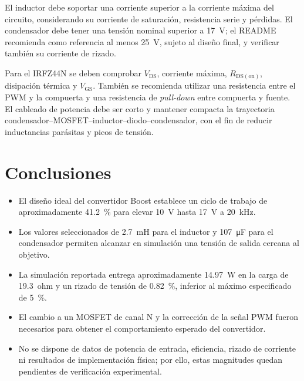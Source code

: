 \documentclass[12pt]{article}
\begin{document}
El inductor debe soportar una corriente superior a la corriente máxima del circuito, considerando su corriente de saturación, resistencia serie y pérdidas. El condensador debe tener una tensión nominal superior a \SI{17}{V}; el README recomienda como referencia al menos \SI{25}{V}, sujeto al diseño final, y verificar también su corriente de rizado.

Para el IRFZ44N se deben comprobar $V_{\mathrm{DS}}$, corriente máxima, $R_{\mathrm{DS(on)}}$, disipación térmica y $V_{\mathrm{GS}}$. También se recomienda utilizar una resistencia entre el PWM y la compuerta y una resistencia de \emph{pull-down} entre compuerta y fuente. El cableado de potencia debe ser corto y mantener compacta la trayectoria condensador--MOSFET--inductor--diodo--condensador, con el fin de reducir inductancias parásitas y picos de tensión.

\section{Conclusiones}
\begin{itemize}
\item El diseño ideal del convertidor Boost establece un ciclo de trabajo de aproximadamente \SI{41.2}{\percent} para elevar \SI{10}{V} hasta \SI{17}{V} a \SI{20}{kHz}.
\item Los valores seleccionados de \SI{2.7}{mH} para el inductor y \SI{107}{\micro F} para el condensador permiten alcanzar en simulación una tensión de salida cercana al objetivo.
\item La simulación reportada entrega aproximadamente \SI{14.97}{W} en la carga de \SI{19.3}{ohm} y un rizado de tensión de \SI{0.82}{\percent}, inferior al máximo especificado de \SI{5}{\percent}.
\item El cambio a un MOSFET de canal N y la corrección de la señal PWM fueron necesarios para obtener el comportamiento esperado del convertidor.
\item No se dispone de datos de potencia de entrada, eficiencia, rizado de corriente ni resultados de implementación física; por ello, estas magnitudes quedan pendientes de verificación experimental.
\end{itemize}
\end{document}
